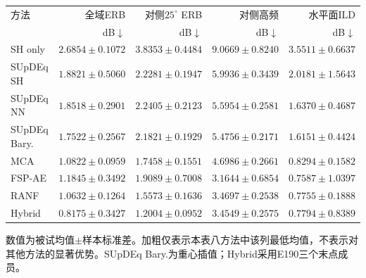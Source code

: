 \begin{table}[htbp]
\centering\small
\setlength{\tabcolsep}{3pt}
\begin{tabular}{lrrrr}
\toprule
方法 & 全域ERB & 对侧$25^\circ$ ERB & 对侧高频 & 水平面ILD\\
 & dB$\downarrow$ & dB$\downarrow$ & dB$\downarrow$ & dB$\downarrow$\\
\midrule
SH only & $2.6854 \pm 0.1072$ & $3.8353 \pm 0.4484$ & $9.0669 \pm 0.8240$ & $3.5511 \pm 0.6637$ \\
SUpDEq SH & $1.8821 \pm 0.5060$ & $2.2281 \pm 0.1947$ & $5.9936 \pm 0.3439$ & $2.0181 \pm 1.5643$ \\
SUpDEq NN & $1.8518 \pm 0.2901$ & $2.2405 \pm 0.2123$ & $5.5954 \pm 0.2581$ & $1.6370 \pm 0.4687$ \\
SUpDEq Bary. & $1.7522 \pm 0.2567$ & $2.1821 \pm 0.1929$ & $5.4756 \pm 0.2171$ & $1.6151 \pm 0.4424$ \\
MCA & $1.0822 \pm 0.0959$ & $1.7458 \pm 0.1551$ & $4.6986 \pm 0.2661$ & $0.8294 \pm 0.1582$ \\
FSP-AE & $1.1845 \pm 0.3492$ & $1.9089 \pm 0.7008$ & $\mathbf{3.1644} \pm 0.6854$ & $\mathbf{0.7587} \pm 1.0397$ \\
RANF & $1.0632 \pm 0.1264$ & $1.5573 \pm 0.1636$ & $3.4697 \pm 0.2538$ & $0.7755 \pm 0.1888$ \\
Hybrid & $\mathbf{0.8175} \pm 0.3427$ & $\mathbf{1.2004} \pm 0.0952$ & $3.4549 \pm 0.2575$ & $0.7794 \pm 0.8389$ \\
\bottomrule
\end{tabular}
\par\smallskip
\parbox{\linewidth}{\footnotesize 数值为被试均值$\pm$样本标准差。加粗仅表示本表八方法中该列最低均值，不表示对其他方法的显著优势。SUpDEq Bary.为重心插值；Hybrid采用E190三个末点成员。}
\end{table}
